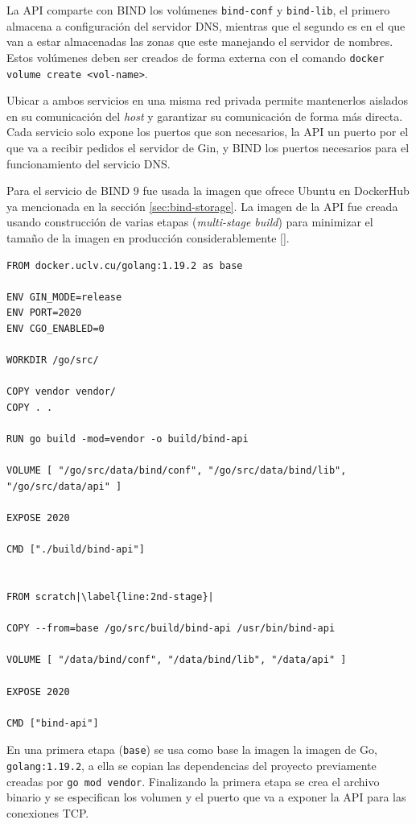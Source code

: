 La API comparte con BIND los volúmenes \verb|bind-conf| y \verb|bind-lib|, el primero almacena a configuración del servidor DNS, mientras que el segundo es en el que van a estar almacenadas las zonas que este manejando el servidor de nombres. Estos volúmenes deben ser creados de forma externa con el comando \verb|docker volume create <vol-name>|.

Ubicar a ambos servicios en una misma red privada permite mantenerlos aislados en su comunicación del \textit{host} y garantizar su comunicación de forma más directa. Cada servicio solo expone los puertos que son necesarios, la API un puerto por el que va a recibir pedidos el servidor de Gin, y BIND los puertos necesarios para el funcionamiento del servicio DNS.

Para el servicio de BIND 9 fue usada la imagen que ofrece Ubuntu en DockerHub ya mencionada en la sección \ref{sec:bind-storage}. La imagen de la API fue creada usando construcción de varias etapas (\textit{multi-stage build}) para minimizar el tamaño de la imagen en producción considerablemente [\cite{multi-stage}].

\begin{lstlisting}[frame=single, escapechar=|, caption=Dockerfile para la API.]
FROM docker.uclv.cu/golang:1.19.2 as base

ENV GIN_MODE=release
ENV PORT=2020
ENV CGO_ENABLED=0

WORKDIR /go/src/

COPY vendor vendor/
COPY . .

RUN go build -mod=vendor -o build/bind-api

VOLUME [ "/go/src/data/bind/conf", "/go/src/data/bind/lib", "/go/src/data/api" ]

EXPOSE 2020

CMD ["./build/bind-api"]


FROM scratch|\label{line:2nd-stage}|

COPY --from=base /go/src/build/bind-api /usr/bin/bind-api

VOLUME [ "/data/bind/conf", "/data/bind/lib", "/data/api" ]

EXPOSE 2020

CMD ["bind-api"]
\end{lstlisting}

En una primera etapa (\verb|base|) se usa como base la imagen la imagen de Go, \verb|golang:1.19.2|, a ella se copian las dependencias del proyecto previamente creadas por \verb|go mod vendor|. Finalizando la primera etapa se crea el archivo binario y se especifican los volumen y el puerto que va a exponer la API para las conexiones TCP.

